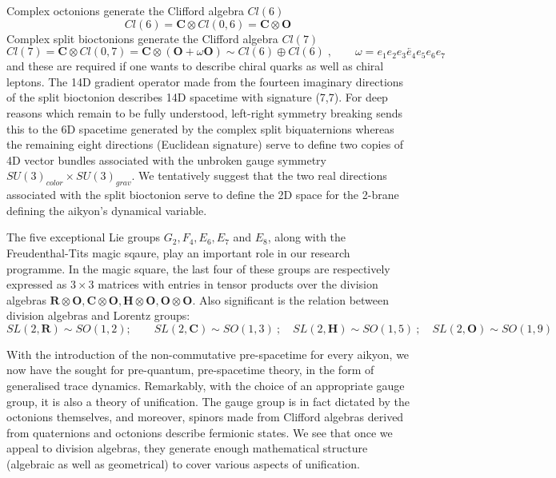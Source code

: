 \documentclass{iopconfser}
\begin{document}
Complex octonions generate the Clifford algebra $Cl(6)$
\begin{equation}
Cl(6) = \mathbf C\otimes Cl(0,6) = \mathbf C \otimes \mathbf O
\end{equation}
Complex split bioctonions generate the Clifford algebra $Cl(7)$
\begin{equation}
Cl(7) = \mathbf C\otimes Cl(0,7) = \mathbf C \otimes (\mathbf O +\omega \mathbf O) \sim Cl(6)\oplus Cl(6)\; , \qquad \omega = \overleftarrow{e_1e_2e_3e_4e_5e_6e_7}
\end{equation}
and these are required if one wants to describe chiral quarks as well as chiral leptons. The 14D gradient operator made from the fourteen imaginary directions of the split bioctonion describes 14D spacetime with signature (7,7). For deep reasons which remain to be fully understood, left-right symmetry breaking sends this to the 6D spacetime generated by the complex split biquaternions whereas the remaining eight directions (Euclidean signature) serve to define two copies of 4D vector bundles associated with the unbroken gauge symmetry $SU(3)_{color}\times SU(3)_{grav}$. We tentatively suggest that the two real directions associated with the split bioctonion serve to define the 2D space for the 2-brane defining the aikyon's dynamical variable.

The five exceptional Lie groups $G_2, F_4, E_6, E_7$ and $E_8$, along with the Freudenthal-Tits magic sqaure, play an important role in our research programme. In the magic square, the last four of these groups are respectively expressed as $3\times 3$ matrices with entries in tensor products over the division algebras $\mathbf R\otimes \mathbf O, \mathbf C\otimes \mathbf O, \mathbf H\otimes \mathbf O, \mathbf O\otimes \mathbf O$. Also significant is the relation between division algebras and Lorentz groups: 
\begin{equation}
SL(2,\mathbf R) \sim SO(1,2); \qquad SL(2,\mathbf C) \sim SO(1,3)\ ; \quad SL(2,\mathbf H) \sim SO(1,5)\ ; \quad SL(2,\mathbf O) \sim SO(1,9)
\end{equation}

With the introduction of the non-commutative pre-spacetime for every aikyon, we now have the sought for pre-quantum, pre-spacetime theory, in the form of generalised trace dynamics. Remarkably, with the choice of an appropriate gauge group, it is also a theory of unification. The gauge group is in fact dictated by the octonions themselves, and moreover, spinors made from Clifford algebras derived from quaternions and octonions describe fermionic states. We see that once we appeal to division algebras, they generate enough mathematical structure (algebraic as well as geometrical) to cover various aspects of unification.
\end{document}
